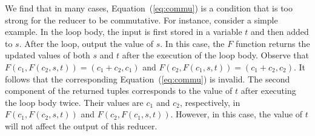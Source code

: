 \documentclass{llncs}
\newcommand{\cur}{cur()}
\begin{document}
We find that in many cases, Equation~(\ref{eq:commu}) is a condition that is too strong for the reducer to be commutative. For instance, consider a simple example. In the loop body, the input is first stored in a variable $t$ and then added to $s$. After the loop, output the value of $s$.
In this case, the $F$ function returns the updated values of both $s$ and $t$ after the execution of the loop body. Observe that
$F(c_1, F(c_2,s,t)) = (c_1+c_2, c_1)$ and $F(c_2, F(c_1,s,t)) = (c_1+c_2, c_2)$. It follows that the corresponding Equation~(\ref{eq:commu}) is invalid. The second component of the returned tuples corresponds to the value of $t$ after executing the loop body twice. Their values are $c_1$ and $c_2$, respectively, in $F(c_1, F(c_2,s,t))$ and $F(c_2, F(c_1,s,t))$. However, in this case, the value of $t$ will not affect the output of this reducer.



\end{document}
